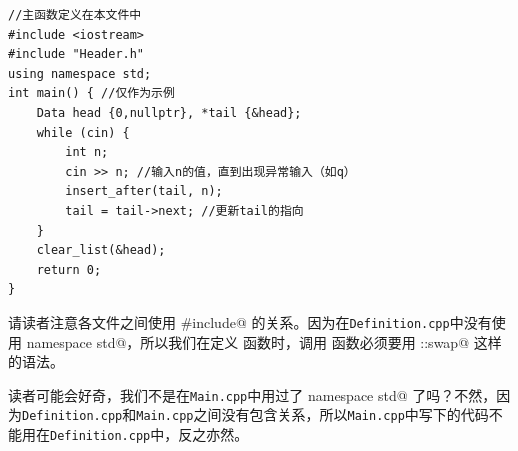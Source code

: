 \begin{lstlisting}[caption=\texttt{Main.cpp}]
//主函数定义在本文件中
#include <iostream>
#include "Header.h"
using namespace std;
int main() { //仅作为示例
    Data head {0,nullptr}, *tail {&head};
    while (cin) {
        int n;
        cin >> n; //输入n的值，直到出现异常输入（如q）
        insert_after(tail, n);
        tail = tail->next; //更新tail的指向
    }
    clear_list(&head);
    return 0;
}
\end{lstlisting}
请读者注意各文件之间使用 \lstinline@#include@ 的关系。因为在\texttt{Definition.cpp}中没有使用 \lstinline@using namespace std@，所以我们在定义 \lstinline@transfer@ 函数时，调用 \lstinline@swap@ 函数必须要用 \lstinline@std::swap@ 这样的语法。\par
读者可能会好奇，我们不是在\texttt{Main.cpp}中用过了 \lstinline@using namespace std@ 了吗？不然，因为\texttt{Definition.cpp}和\texttt{Main.cpp}之间没有包含关系，所以\texttt{Main.cpp}中写下的代码不能用在\texttt{Definition.cpp}中，反之亦然。\par
